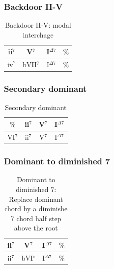 \documentclass{article}
\begin{document}
\subsubsection{Backdoor II-V}
\begin{table}[!h]
	\caption{Backdoor II-V: modal interchage}
	\centering
	\begin{tabular}{| c | c | c | c |}
		\hline
		\phantom{x}ii$^7$\phantom{x} & \phantom{x}V$^7$\phantom{x} & \phantom{x}I$^{\Delta 7}$\phantom{x}  & \phantom{x}$\%$\phantom{x} \\
		\hline
		\phantom{x}iv$^7$\phantom{x} & \phantom{x}bVII$^7$\phantom{x} & \phantom{x}I$^{\Delta 7}$\phantom{x}  & \phantom{x}$\%$\phantom{x} \\
		\hline
	\end{tabular}
	\label{tab: }
\end{table}

\subsubsection{Secondary dominant}
\begin{table}[!h]
	\caption{Secondary dominant}
	\centering
	\begin{tabular}{| c | c | c | c |}
		\hline
		 \phantom{x}$\%$\phantom{x} & \phantom{x}ii$^7$\phantom{x} & \phantom{x}V$^7$\phantom{x} & \phantom{x}I$^{\Delta 7}$\phantom{x}   \\
		\hline
		\phantom{x}VI$^7$\phantom{x} & \phantom{x}ii$^7$\phantom{x} &  \phantom{x}V$^{7}$\phantom{x}  & \phantom{x}I$^{\Delta 7}$\phantom{x} \\
		\hline
	\end{tabular}
	\label{tab: }
\end{table}

\subsubsection{Dominant to diminished 7}
\begin{table}[!h]
	\caption{Dominant to diminished 7: Replace dominant chord by a diminishe 7 chord half step above the root}
	\centering
	\begin{tabular}{| c | c | c | c |}
		\hline
		\phantom{x}ii$^7$\phantom{x} & \phantom{x}V$^7$\phantom{x} & \phantom{x}I$^{\Delta 7}$\phantom{x}  & \phantom{x}$\%$\phantom{x} \\
		\hline
		\phantom{x}ii$^7$\phantom{x} & \phantom{x}bVI$^\circ$\phantom{x} & \phantom{x}I$^{\Delta 7}$\phantom{x}  & \phantom{x}$\%$\phantom{x} \\
		\hline
	\end{tabular}
	\label{tab:tritone-subs }
\end{table}
\end{document}
